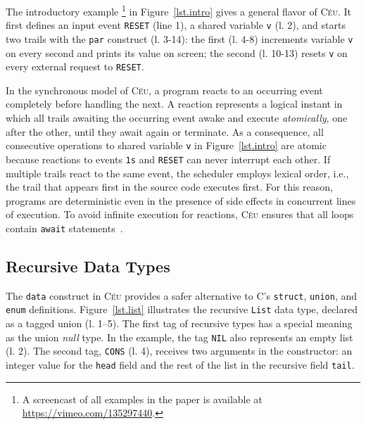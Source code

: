 \documentclass{sig-alternate}
\newcommand{\CEU}{\textsc{C\'{e}u}\xspace}
\newcommand{\code}[1] {{\small{\texttt{#1}}}}
\begin{document}

The introductory example%
\footnote{A screencast of all examples in the paper is available at 
\url{https://vimeo.com/135297440}.}
in Figure~\ref{lst.intro} gives a general flavor of \CEU.
It first defines an input event \code{RESET} (line 1), a shared variable 
\code{v} (l. 2), and starts two trails with the \code{par} construct (l. 
3-14): the first (l. 4-8) increments variable \code{v} on every second and 
prints its value on screen; the second (l. 10-13) resets \code{v} on every 
external request to \code{RESET}.

In the synchronous model of \CEU, a program reacts to an occurring event 
completely before handling the next.
%
A reaction represents a logical instant in which all trails awaiting the 
occurring event awake and execute \emph{atomically}, one after the other, until 
they await again or terminate.
%
As a consequence, all consecutive operations to shared variable \code{v} in 
Figure~\ref{lst.intro} are atomic because reactions to events \code{1s} and 
\code{RESET} can never interrupt each other.
%
If multiple trails react to the same event, the scheduler employs lexical 
order, i.e., the trail that appears first in the source code executes first.
%
For this reason, programs are deterministic even in the presence of side 
effects in concurrent lines of execution.
%
To avoid infinite execution for reactions, \CEU ensures that all loops contain 
\code{await} statements~\cite{ceu.sensys13}.

\subsection{Recursive Data Types}

The \code{data} construct in \CEU provides a safer alternative to C's
\code{struct}, \code{union}, and \code{enum} definitions.
%
Figure~\ref{lst.list} illustrates the recursive \code{List} data type,
declared as a tagged union (l. 1--5).
The first tag of recursive types has a special meaning as the union \emph{null} 
type.
In the example, the tag \code{NIL} also represents an empty list (l. 2).
The second tag, \code{CONS} (l. 4), receives two arguments in the constructor: 
an integer value for the \code{head} field and the rest of the list in the 
recursive field \code{tail}.
\end{document}
